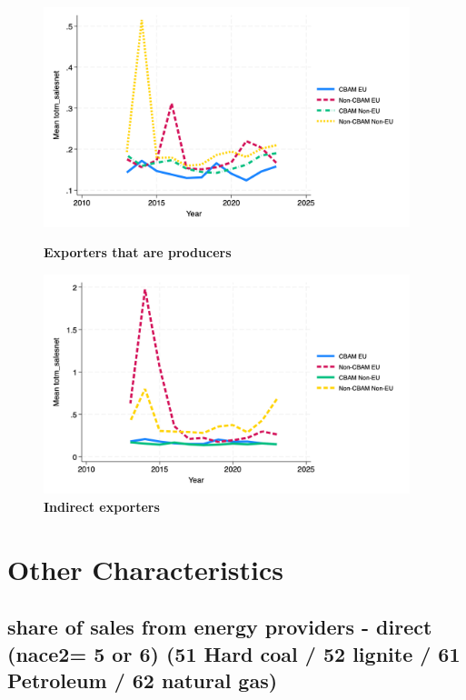 \documentclass{article}
\begin{document}
\begin{figure}[H]
\centering
\includegraphics[width=0.95\textwidth]{totm_salesnet_ep.png}
\caption{\textbf{Exporters that are producers}}
\includegraphics[width=0.95\textwidth]{totm_salesnet_indir.png}
\caption{\textbf{Indirect exporters}}
\end{figure}

\section{Other Characteristics}
\subsection{share of sales from energy providers - direct (nace2= 5 or 6) (51 Hard coal / 52 lignite / 61 Petroleum / 62 natural gas)}
\end{document}

